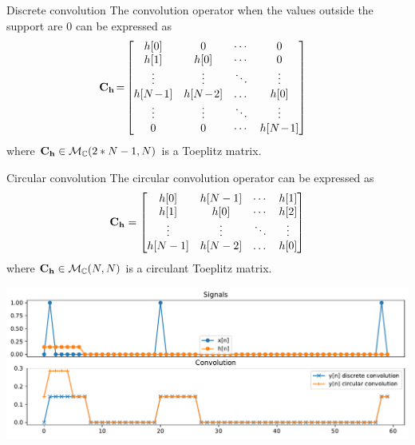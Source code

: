\begin{block}{Discrete convolution}
  The convolution operator when the values outside the support are $0$ can be expressed as\vspace{-2mm}
  $$ \hspace{-3mm}\C_\h\hspace{-.5mm} =\hspace{-.5mm}\begin{bmatrix}
      h[0] & 0 & \cdots& 0\\
      h[1] & h[0] & \cdots& 0\\
      \vdots & \vdots & \ddots & \vdots\\
      h[N\hspace{-.5mm}-\hspace{-.5mm}1] & h[N\hspace{-.5mm}-\hspace{-.5mm}2 ] & \dots&  h[0]\\
      \vdots & \vdots & \ddots & \vdots\\
      0 & 0 &\cdots & h[N\hspace{-.5mm}-\hspace{-.5mm}1] 
  \end{bmatrix} $$
  where $\mathbf{C}_{\mathbf{h}}\in \mathcal{M}_\mathbb{C}(2*N-1,N)$ is a Toeplitz matrix.
\end{block}

\begin{block}{Circular convolution}
  The circular convolution operator can be expressed as
  $$ \mathbf{C}_{\mathbf{h}} =\begin{bmatrix}
      h[0] & h[N-1] & \cdots& h[1]\\
      h[1] & h[0] & \cdots& h[2]\\
      \vdots & \vdots & \ddots & \vdots\\
      h[N-1] & h[N-2 ] & \dots&  h[0]\\
  \end{bmatrix} $$
  where $\mathbf{C}_{\mathbf{h}}\in \mathcal{M}_\mathbb{C}(N,N)$ is a circulant Toeplitz matrix.
\end{block}

\begin{center}
  \includegraphics[width=.9\linewidth]{imgs/sig_conv/circ_conv_border.pdf}
\end{center}

